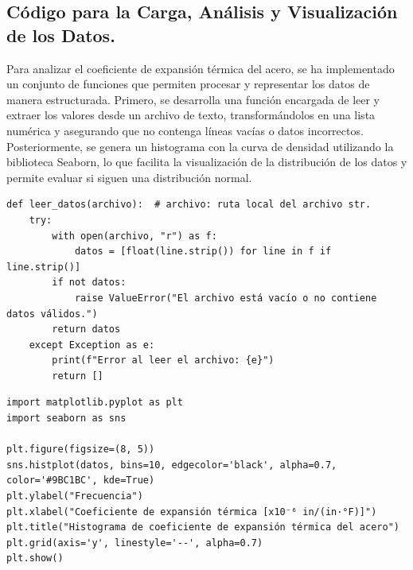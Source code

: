 \documentclass{article}
\begin{document}
\newpage
\subsection{Código para la Carga, Análisis y Visualización de los Datos.}
Para analizar el coeficiente de expansión térmica del acero, se ha implementado un conjunto de funciones que permiten procesar y representar los datos de manera estructurada. Primero, se desarrolla una función encargada de leer y extraer los valores desde un archivo de texto, transformándolos en una lista numérica y asegurando que no contenga líneas vacías o datos incorrectos. Posteriormente, se genera un histograma con la curva de densidad utilizando la biblioteca Seaborn, lo que facilita la visualización de la distribución de los datos y permite evaluar si siguen una distribución normal.

\begin{verbatim}
def leer_datos(archivo):  # archivo: ruta local del archivo str.
    try:
        with open(archivo, "r") as f:
            datos = [float(line.strip()) for line in f if line.strip()]
        if not datos:
            raise ValueError("El archivo está vacío o no contiene datos válidos.")
        return datos
    except Exception as e:
        print(f"Error al leer el archivo: {e}")
        return []
\end{verbatim}

\begin{verbatim}
import matplotlib.pyplot as plt
import seaborn as sns

plt.figure(figsize=(8, 5))
sns.histplot(datos, bins=10, edgecolor='black', alpha=0.7, color='#9BC1BC', kde=True)
plt.ylabel("Frecuencia")
plt.xlabel("Coeficiente de expansión térmica [x10⁻⁶ in/(in·°F)]")
plt.title("Histograma de coeficiente de expansión térmica del acero")
plt.grid(axis='y', linestyle='--', alpha=0.7)
plt.show()
\end{verbatim}
\end{document}
